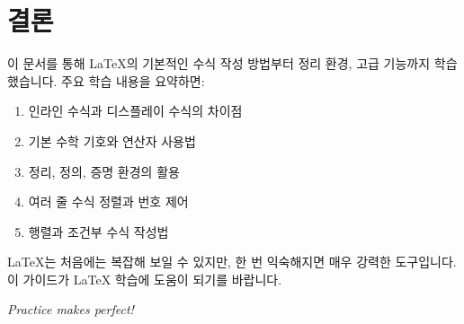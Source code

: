 \documentclass[12pt,a4paper]{article}
\begin{document}
\section{결론}

이 문서를 통해 LaTeX의 기본적인 수식 작성 방법부터 정리 환경, 고급 기능까지 학습했습니다.
주요 학습 내용을 요약하면:

\begin{enumerate}
    \item 인라인 수식과 디스플레이 수식의 차이점
    \item 기본 수학 기호와 연산자 사용법
    \item 정리, 정의, 증명 환경의 활용
    \item 여러 줄 수식 정렬과 번호 제어
    \item 행렬과 조건부 수식 작성법
\end{enumerate}

LaTeX는 처음에는 복잡해 보일 수 있지만, 한 번 익숙해지면 매우 강력한 도구입니다.
이 가이드가 LaTeX 학습에 도움이 되기를 바랍니다.

\vspace{1cm}
\begin{center}
    \textit{Practice makes perfect!}
\end{center}
\end{document}
